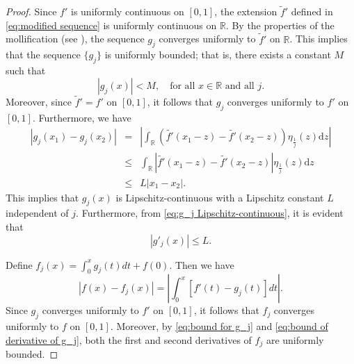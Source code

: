 \documentclass[11pt,reqno]{amsart}
\theoremstyle{definition}
\theoremstyle{remark}
\numberwithin{equation}{section}
\begin{document}
\begin{proof}
Since $f'$ is uniformly continuous on $[0,1]$, the extension $\tilde{f}'$ defined in \eqref{eq:modified sequence} is uniformly continuous on $\mathbb{R}$. By the properties of the mollification (see \cite{Eva10}), the sequence $g_j$ converges uniformly to $\tilde{f}'$ on $\mathbb{R}$. This implies that the sequence $\{g_j\}$ is uniformly bounded; that is, there exists a constant $M$ such that
\begin{equation}\label{eq:bound for g_j}
	|g_j(x)| < M, \quad \text{for all } x \in \mathbb{R} \text{ and all } j.
\end{equation}
Moreover, since $\tilde{f}' = f'$ on $[0,1]$, it follows that $g_j$ converges uniformly to $f'$ on $[0,1]$. Furthermore, we have
\begin{eqnarray}\label{eq:g_j Lipschitz-continuous}
		\left|g_j(x_1) - g_j(x_2)\right|
		&=& \left|\int_{\mathbb{R}} \left(\tilde{f'}(x_1 - z) - \tilde{f'}(x_2 - z)\right) \eta_{\frac{1}{j}}(z) \mathrm{d} z\right| \nonumber\\
		&\leq& \int_{\mathbb{R}} \left|\tilde{f'}(x_1 - z) - \tilde{f'}(x_2 - z)\right| \eta_{\frac{1}{j}}(z) \mathrm{d} z \nonumber\\
		&\leq & L \left|x_1 - x_2\right| \text{.}
\end{eqnarray}
This implies that $g_j(x)$ is Lipschitz-continuous with a Lipschitz constant $L$ independent of $j$. Furthermore, from \eqref{eq:g_j Lipschitz-continuous}, it is evident that
\begin{equation}\label{eq:bound of derivative of g_j}
	|g'_j(x)| \leq L.
\end{equation}

Define $f_j(x) = \int_0^x g_j(t)  dt + f(0)$. Then we have
\begin{equation*}
	|f(x) - f_j(x)| = \left| \int_0^x [f'(t) - g_j(t)]  dt \right|.
\end{equation*}
Since $g_j$ converges uniformly to $f'$ on $[0,1]$, it follows that $f_j$ converges uniformly to $f$ on $[0,1]$. Moreover, by \eqref{eq:bound for g_j} and \eqref{eq:bound of derivative of g_j}, both the first and second derivatives of $f_j$ are uniformly bounded.


\end{proof}
\end{document}
